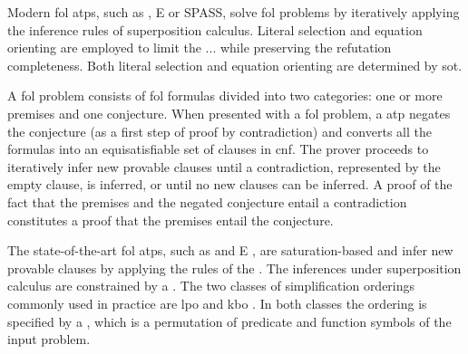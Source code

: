 

Modern \gls{fol} \glspl{atp}, such as \Vampire{}, E or SPASS,
solve \gls{fol} problems by iteratively applying the inference rules of superposition calculus.
Literal selection and equation orienting are employed to limit the ... while preserving the refutation completeness.
Both literal selection and equation orienting are determined by \gls{sot}.

A \gls{fol} problem consists of \gls{fol} formulas divided into two categories:
one or more premises and one conjecture.
When presented with a \gls{fol} problem,
a  \gls{atp} negates the conjecture (as a first step of proof by contradiction)
and converts all the formulas into an equisatisfiable set of clauses in \gls{cnf}.
The prover proceeds to iteratively infer new provable clauses
until a contradiction, represented by the empty clause, is inferred,
or until no new clauses can be inferred.
A proof of the fact that the premises and the negated conjecture entail a contradiction
constitutes a proof that the premises entail the conjecture.

The state-of-the-art \gls{fol} \glspl{atp},
such as \Vampire{} \cite{10.1007/978-3-642-39799-8_1} and E \cite{10.1007/978-3-030-29436-6_29},
are saturation-based and
infer new provable clauses by applying the rules of the .
The inferences under superposition calculus are constrained by a .
The two classes of simplification orderings commonly used in practice are
\gls{lpo} \cite{Kamin1980} and \gls{kbo} \cite{Knuth1983}.
In both classes the ordering is specified by a ,
which is a permutation of predicate and function symbols of the input problem.

